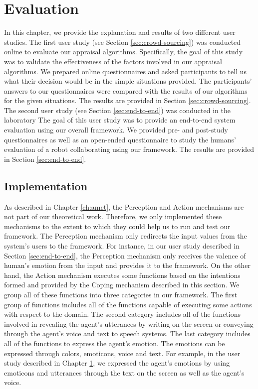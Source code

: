 \documentclass[12pt]{report}
\begin{document}
\chapter{Evaluation}
\label{ch:awareness}

In this chapter, we provide the explanation and results of two different user
studies. The first user study (see Section \ref{sec:crowd-sourcing}) was
conducted online to evaluate our appraisal algorithms. Specifically, the goal of
this study was to validate the effectiveness of the factors involved in our
appraisal algorithms. We prepared online questionnaires and asked participants
to tell us what their decision would be in the simple situations provided. The
participants' answers to our questionnaires were compared with the results of
our algorithms for the given situations. The results are provided in Section
\ref{sec:crowd-sourcing}. The second user study (see Section
\ref{sec:end-to-end}) was conducted in the laboratory The goal of this user
study was to provide an end-to-end system evaluation using our overall
framework. We provided pre- and post-study questionnaires as well as an
open-ended questionnaire to study the humans' evaluation of a robot
collaborating using our framework. The results are provided in Section
\ref{sec:end-to-end}.

\section{Implementation}
As described in Chapter \ref{ch:amct}, the Perception and Action mechanisms are
not part of our theoretical work. Therefore, we only implemented these
mechanisms to the extent to which they could help us to run and test our
framework. The Perception mechanism only redirects the input values from the
system's users to the framework. For instance, in our user study described in
Section \ref{sec:end-to-end}, the Perception mechanism only receives the valence
of human's emotion from the input and provides it to the framework.
On the other hand, the Action mechanism executes some functions based on the
intentions formed and provided by the Coping mechanism described in this
section. We group all of these functions into three categories in our framework.
The first group of functions includes all of the functions capable of executing
some actions with respect to the domain. The second category includes all of the
functions involved in revealing the agent's utterances by writing on the screen or
conveying through the agent's voice and text to speech systems. The last
category includes all of the functions to express the agent's emotion. The
emotions can be expressed through colors, emoticons, voice and text. For
example, in the user study described in Chapter \ref{ch:awareness}, we expressed
the agent's emotions by using emoticons and utterances through the text on the
screen as well as the agent's voice.
\end{document}
